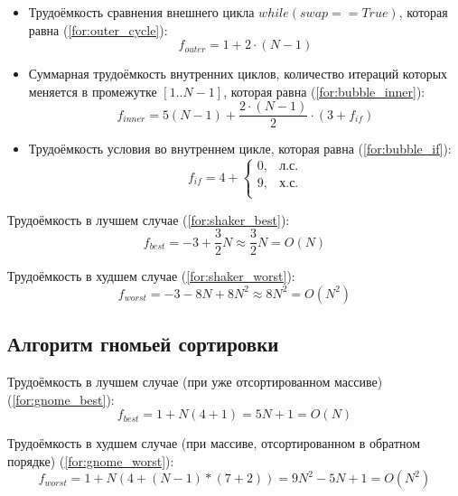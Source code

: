 \begin{itemize}
	\item Трудоёмкость сравнения внешнего цикла $while(swap == True)$, которая равна (\ref{for:outer_cycle}):
	\begin{equation}
		\label{for:outer_cycle}
		f_{outer} = 1 + 2 \cdot (N - 1)
	\end{equation}
	\item Суммарная трудоёмкость внутренних циклов, количество итераций которых меняется в промежутке $[1..N-1]$, которая равна (\ref{for:bubble_inner}):
	\begin{equation}
		\label{for:bubble_inner}
		f_{inner} = 5(N - 1) + \frac{2 \cdot (N - 1)}{2} \cdot (3 + f_{if})
	\end{equation}
	\item Трудоёмкость условия во внутреннем цикле, которая равна (\ref{for:bubble_if}):
	\begin{equation}
		\label{for:bubble_if}
		f_{if} = 4 + \begin{cases}
			0, & \text{л.с.}\\
			9, & \text{х.с.}\\
		\end{cases}
	\end{equation}
\end{itemize}

Трудоёмкость в лучшем случае (\ref{for:shaker_best}):
\begin{equation}
	\label{for:shaker_best}
	f_{best} = -3 + \frac{3}{2} N \approx \frac{3}{2} N = O(N)
\end{equation}

Трудоёмкость в худшем случае (\ref{for:shaker_worst}):
\begin{equation}
	\label{for:shaker_worst}
	f_{worst} = -3 - 8N + 8N^2 \approx 8N^2 = O(N^2)
\end{equation}


\subsection{Алгоритм гномьей сортировки}

Трудоёмкость в лучшем случае (при уже отсортированном массиве) (\ref{for:gnome_best}):
\begin{equation}
	\label{for:gnome_best}
    f_{best} = 1 + N(4 + 1) = 5N + 1 = O(N)
\end{equation}

Трудоёмкость в худшем случае (при массиве, отсортированном в обратном порядке) (\ref{for:gnome_worst}):
\begin{equation}
	\label{for:gnome_worst}
    f_{worst} = 1 + N(4 + (N - 1) * (7 + 2)) = 9N^2 - 5N + 1 = O(N^2)
\end{equation}


